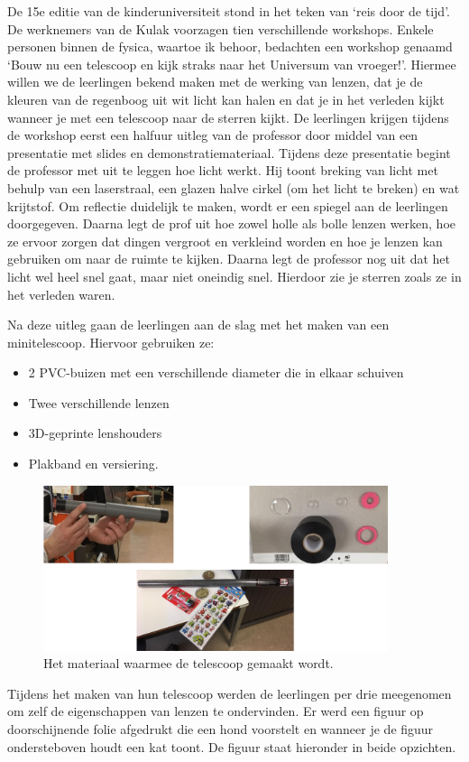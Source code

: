 \documentclass[a4paper,12pt,twoside]{article}%
\begin{document}
	
	De 15e editie van de kinderuniversiteit stond in het teken van `reis door de tijd'. De werknemers van de Kulak voorzagen tien verschillende workshops. Enkele personen binnen de fysica, waartoe ik behoor, bedachten een workshop genaamd `Bouw nu een telescoop en kijk straks naar het Universum van vroeger!'. Hiermee willen we de leerlingen bekend maken met de werking van lenzen, dat je de kleuren van de regenboog uit wit licht kan halen en dat je in het verleden kijkt wanneer je met een telescoop naar de sterren kijkt. De leerlingen krijgen tijdens de workshop eerst een halfuur uitleg van de professor door middel van een presentatie met slides en demonstratiemateriaal. Tijdens deze presentatie begint de professor met uit te leggen hoe licht werkt. Hij toont breking van licht met behulp van een laserstraal, een glazen halve cirkel (om het licht te breken) en wat krijtstof. Om reflectie duidelijk te maken, wordt er een spiegel aan de leerlingen doorgegeven. Daarna legt de prof uit hoe zowel holle als bolle lenzen werken, hoe ze ervoor zorgen dat dingen vergroot en verkleind worden en hoe je lenzen kan gebruiken om naar de ruimte te kijken. Daarna legt de professor nog uit dat het licht wel heel snel gaat, maar niet oneindig snel. Hierdoor zie je sterren zoals ze in het verleden waren. \newline\newline
	
	Na deze uitleg gaan de leerlingen aan de slag met het maken van een minitelescoop. Hiervoor gebruiken ze:
	\begin{itemize}
		\item 2 PVC-buizen met een verschillende diameter die in elkaar schuiven
		\item Twee verschillende lenzen
		\item 3D-geprinte lenshouders
		\item Plakband en versiering.
	\end{itemize}
	\begin{figure}[!h]
		\centering
		\includegraphics[width=0.9\textwidth]{Telescoop}
		\caption{Het materiaal waarmee de telescoop gemaakt wordt.}
		\label{Fig::Telescoop}
	\end{figure}
	Tijdens het maken van hun telescoop werden de leerlingen per drie meegenomen om zelf de eigenschappen van lenzen te ondervinden. Er werd een figuur op doorschijnende folie afgedrukt die een hond voorstelt en wanneer je de figuur ondersteboven houdt een kat toont. De figuur staat hieronder in beide opzichten.
	
\end{document}
